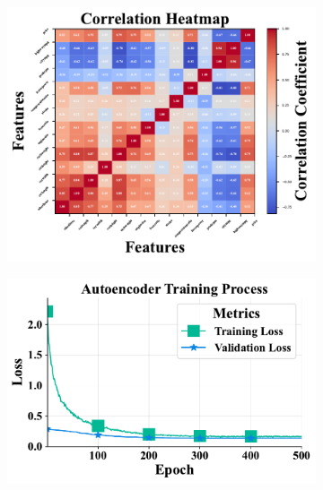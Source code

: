 \documentclass{article} %
\begin{document}
\begin{figure}[!t]
   \centering
   \begin{subfigure}{.32\textwidth}  %
       \centering
       \includegraphics[width=1.0\linewidth]{./figures/correlation_heatmap.pdf}
       \vspace{-5pt}
       \label{fig:heatmap}
   \end{subfigure}
   \hfill %
   \begin{subfigure}{.32\textwidth}
       \centering
       \includegraphics[width=1.0\linewidth]{./figures/autoencoder_training_loss.pdf}

\end{subfigure}
\end{figure}
\end{document}
